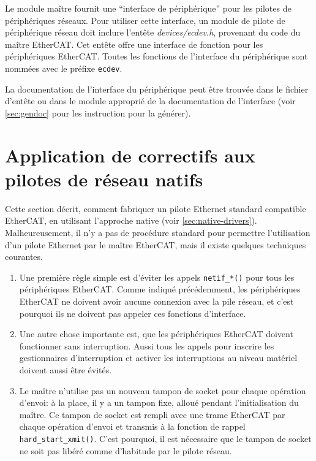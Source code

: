 \documentclass[a4paper,12pt,BCOR6mm,bibtotoc,idxtotoc]{scrbook}
\begin{document}
Le module ma\^itre fournit une ``interface de p\'eriph\'erique'' pour
les pilotes de p\'eriph\'eriques r\'eseaux.  Pour utiliser cette
interface, un module de pilote de p\'eriph\'erique r\'eseau doit
inclure l'ent\^ete
\textit{devices/ecdev.h},
provenant du code du ma\^itre EtherCAT. Cet ent\^ete offre une
interface de fonction pour les p\'eriph\'eriques EtherCAT. Toutes les
fonctions de l'interface du p\'eriph\'erique sont nomm\'ees avec le
pr\'efixe \lstinline+ecdev+.

La documentation de l'interface du p\'eriph\'erique peut \^etre
trouv\'ee dans le fichier d'ent\^ete ou dans le module appropri\'e de
la documentation de l'interface (voir \autoref{sec:gendoc} pour les
instruction pour la g\'en\'erer).



\section{Application de correctifs aux pilotes de r\'eseau natifs}
\label{sec:patching}

Cette section d\'ecrit, comment fabriquer un pilote Ethernet standard
compatible EtherCAT, en utilisant l'approche native (voir
\autoref{sec:native-drivers}).  Malheureusement, il n'y a pas de
proc\'edure standard pour permettre l'utilisation d'un pilote Ethernet
par le ma\^itre EtherCAT, mais il existe quelques techniques
courantes.

\begin{enumerate}

\item Une premi\`ere r\`egle simple est d'\'eviter les appels
  \lstinline+netif_*()+ pour tous les p\'eriph\'eriques EtherCAT.
  Comme indiqu\'e pr\'ec\'edemment, les p\'eriph\'eriques EtherCAT ne
  doivent avoir aucune connexion avec la pile r\'eseau, et c'est
  pourquoi ils ne doivent pas appeler ces fonctions d'interface.

\item Une autre chose importante est, que les p\'eriph\'eriques
  EtherCAT doivent fonctionner sans interruption.  Aussi tous les
  appels pour inscrire les gestionnaires d'interruption et activer les
  interruptions au niveau mat\'eriel doivent aussi \^etre \'evit\'es.

\item Le ma\^itre n'utilise pas un nouveau tampon de socket pour
  chaque op\'eration d'envoi: \`a la place, il y a un tampon fixe,
  allou\'e pendant l'initialisation du ma\^itre. Ce tampon de socket
  est rempli avec une trame EtherCAT par chaque op\'eration d'envoi et
  transmis \`a la fonction de rappel
  \lstinline+hard_start_xmit()+. C'est pourquoi, il est n\'ecessaire
  que le tampon de socket ne soit pas lib\'er\'e comme d'habitude par
  le pilote r\'eseau.

\end{enumerate}
\end{document}
